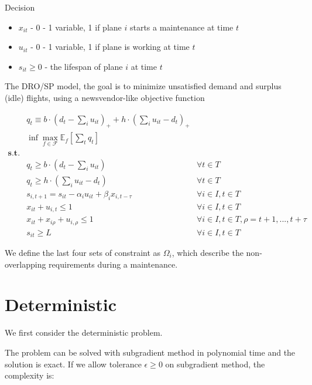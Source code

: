 \documentclass[
  a4paper,
,tablecaptionabove
]{scrartcl}
\numberwithin{equation}{section}
\providecommand{\tightlist}{%
  \setlength{\itemsep}{0pt}\setlength{\parskip}{0pt}}
\renewenvironment{quote}{\begin{customblockquote}\list{}{\rightmargin=0em\leftmargin=0em}%
\item\relax\color{blockquote-text}\ignorespaces}{\unskip\unskip\endlist\end{customblockquote}}
\begin{document}
\begin{quote}
Decision
\end{quote}

\begin{itemize}
\tightlist
\item
  \(x_{it}\) - 0 - 1 variable, 1 if plane \(i\) starts a maintenance at
  time \(t\)
\item
  \(u_{it}\) - 0 - 1 variable, 1 if plane is working at time \(t\)
\item
  \(s_{it} \ge 0\) - the lifespan of plane \(i\) at time \(t\)
\end{itemize}

The DRO/SP model, the goal is to minimize unsatisfied demand and surplus
(idle) flights, using a newsvendor-like objective function

\[\begin{aligned}
& q_t \equiv b \cdot (d_t - \sum_i u_{it})_+ + h \cdot  ( \sum_i u_{it} - d_t)_+  \\
  & \inf \max_{f\in \mathscr F}\mathbb E_f \left[ \sum_t q_t  \right] \\
  \mathbf{s.t.}  & \\
  & q_t \ge b\cdot \left (d_t - \sum_i u_{it} \right) & \forall t \in T \\
  & q_t \ge h\cdot \left (\sum_i u_{it} - d_t \right ) & \forall t \in T \\
  &  s_{i, t+1} =  s_{i t}  - \alpha_i  u_{it} + \beta_i  x_{i, t- \tau} & \forall i \in I, t \in T\\
  &  x_{it} +  u_{i, t} \le 1& \forall i \in I, t \in T\\
  &  x_{it} + x_{i\rho} + u_{i, \rho} \le 1& \forall i \in I,  t\in T, \rho = t + 1, ..., t+\tau \\
  &   s_{i t} \ge L& \forall i \in I, t \in T 
\end{aligned}\]

We define the last four sets of constraint as \(\Omega_i\), which
describe the non-overlapping requirements during a maintenance.

\hypertarget{deterministic}{%
\section{Deterministic}\label{deterministic}}

We first consider the deterministic problem.

The problem can be solved with subgradient method in polynomial time and
the solution is exact. If we allow tolerance \(\epsilon \ge 0\) on
subgradient method, the complexity is:
\end{document}
